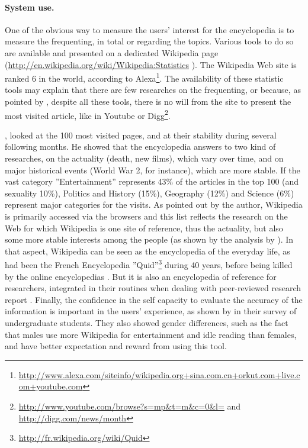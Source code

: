 \paragraph{System use.}

One of the obvious way to measure the users' interest for the encyclopedia
is to measure the frequenting, in total or regarding the topics. Various
tools to do so are available and presented on a dedicated Wikipedia
page (\url{http://en.wikipedia.org/wiki/Wikipedia:Statistics} ).
The Wikipedia Web site is ranked 6 in the world, according to Alexa\footnote{\url{http://www.alexa.com/siteinfo/wikipedia.org+sina.com.cn+orkut.com+live.com+youtube.com}}.
The availability of these statistic tools may explain that there are
few researches on the frequenting, or because, as pointed by \citet{Spoerri07a},
despite all these tools, there is no will from the site to present
the most visited article, like in Youtube or Digg\footnote{\url{http://www.youtube.com/browse?s=mp&t=m&c=0&l=} and \url{http://digg.com/news/month}}. 

\citet[a, b]{Spoerri07a}, \nocite{Spoerri07b} looked at the 100
most visited pages, and at their stability during several following
months. He showed that the encyclopedia answers to two kind of researches,
on the actuality (death, new films), which vary over time, and on
major historical events (World War 2, for instance), which are more
stable. If the vast category ''Entertainment'' represents 43\% of
the articles in the top 100 (and sexuality 10\%), Politics and History
(15\%), Geography (12\%) and Science (6\%) represent major categories
for the visits. As pointed out by the author, Wikipedia is primarily
accessed via the browsers and this list reflects the research on the
Web for which Wikipedia is one site of reference, thus the actuality,
but also some more stable interests among the people (as shown by
the analysis by \citealp{Ratkiewiczetal10}). In that aspect, Wikipedia
can be seen as the encyclopedia of the everyday life, as had been
the French Encyclopedia ''Quid''\footnote{\url{http://fr.wikipedia.org/wiki/Quid}}
during 40 years, before being killed by the online encyclopedias \citep{CapitalQuid07}.
But it is also an encyclopedia of reference for researchers, integrated
in their routines when dealing with peer-reviewed research report
\citep{Dooley10}. Finally, the confidence in the self capacity to
evaluate the accuracy of the information is important in the users'
experience, as shown by \citet{LimKwon10} in their survey of undergraduate
students. They also showed gender differences, such as the fact that
males use more Wikipedia for entertainment and idle reading than females,
and have better expectation and reward from using this tool. 

